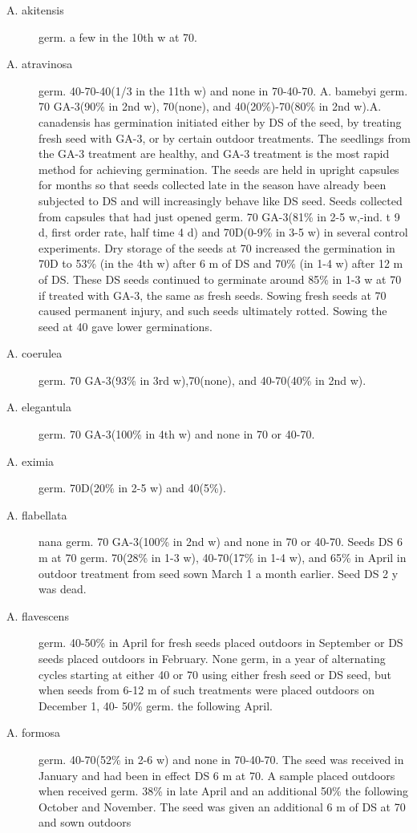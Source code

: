 \begin{description}
\item[A. akitensis] germ. a few in the 10th w at 70.
\item[A. atravinosa] germ. 40-70-40(1/3 in the 11th w) and none in 70-40-70.
A. bamebyi germ. 70 GA-3(90\% in 2nd w), 70(none), and 40(20\%)-70(80\% in
2nd w).A. canadensis has germination initiated either by DS of the seed, by treating
fresh seed with GA-3, or by certain outdoor treatments. The seedlings from the GA-3
treatment are healthy, and GA-3 treatment is the most rapid method for achieving
germination. The seeds are held in upright capsules for months so that seeds
collected late in the season have already been subjected to DS and will increasingly
behave like DS seed. Seeds collected from capsules that had just opened germ. 70
GA-3(81\% in 2-5 w,-ind. t 9 d, first order rate, half time 4 d) and 70D(0-9\% in 3-5
w) in several control experiments. Dry storage of the seeds at 70 increased the
germination in 70D to 53\% (in the 4th w) after 6 m of DS and 70\% (in 1-4 w) after 12 m
of DS. These DS seeds continued to germinate around 85\% in 1-3 w at 70 if treated
with GA-3, the same as fresh seeds. Sowing fresh seeds at 70 caused permanent
injury, and such seeds ultimately rotted. Sowing the seed at 40 gave lower
germinations.
\item[A. coerulea] germ. 70 GA-3(93\% in 3rd w),70(none), and 40-70(40\% in 2nd w).
\item[A. elegantula] germ. 70 GA-3(100\% in 4th w) and none in 70 or 40-70.
\item[A. eximia] germ. 70D(20\% in 2-5 w) and 40(5\%).
\item[A. flabellata] nana germ. 70 GA-3(100\% in 2nd w) and none in 70 or 40-70.
Seeds DS 6 m at 70 germ. 70(28\% in 1-3 w), 40-70(17\% in 1-4 w), and 65\% in April in
outdoor treatment from seed sown March 1 a month earlier. Seed DS 2 y was dead.
\item[A. flavescens] germ. 40-50\% in April for fresh seeds placed outdoors in
September or DS seeds placed outdoors in February. None germ, in a year of
alternating cycles starting at either 40 or 70 using either fresh seed or DS seed, but
when seeds from 6-12 m of such treatments were placed outdoors on December 1, 40-
50\% germ. the following April.
\item[A. formosa] germ. 40-70(52\% in 2-6 w) and none in 70-40-70. The seed was
received in January and had been in effect DS 6 m at 70. A sample placed outdoors
when received germ. 38\% in late April and an additional 50\% the following October
and November. The seed was given an additional 6 m of DS at 70 and sown outdoors

\end{description}
